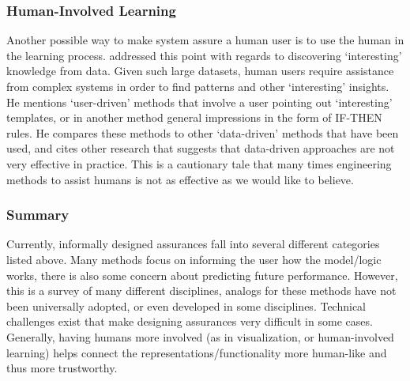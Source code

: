 \subsubsection{Human-Involved Learning}
    Another possible way to make system assure a human user is to use the human in the learning process. \citet{Freitas2006-qo} addressed this point with regards to discovering `interesting' knowledge from data. Given such large datasets, human users require assistance from complex systems in order to find patterns and other `interesting' insights. He mentions `user-driven' methods that involve a user pointing out `interesting' templates, or in another method general impressions in the form of IF-THEN rules. He compares these methods to other `data-driven' methods that have been used, and cites other research that suggests that data-driven approaches are not very effective in practice. This is a cautionary tale that many times engineering methods to assist humans is not as effective as we would like to believe.  

\subsubsection{Summary}
Currently, informally designed assurances fall into several different categories listed above. Many methods focus on informing the user how the model/logic works, there is also some concern about predicting future performance. However, this is a survey of many different disciplines, analogs for these methods have not been universally adopted, or even developed in some disciplines. Technical challenges exist that make designing assurances very difficult in some cases. Generally, having humans more involved (as in visualization, or human-involved learning) helps connect the representations/functionality more human-like and thus more trustworthy. 
